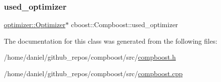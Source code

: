 \subsubsection{\texorpdfstring{used\+\_\+optimizer}{used\_optimizer}}
{\footnotesize\ttfamily \hyperlink{classoptimizer_1_1_optimizer}{optimizer\+::\+Optimizer}$\ast$ cboost\+::\+Compboost\+::used\+\_\+optimizer\hspace{0.3cm}{\ttfamily [private]}}



The documentation for this class was generated from the following files\+:\begin{DoxyCompactItemize}
\item 
/home/daniel/github\+\_\+repos/compboost/src/\hyperlink{compboost_8h}{compboost.\+h}\item 
/home/daniel/github\+\_\+repos/compboost/src/\hyperlink{compboost_8cpp}{compboost.\+cpp}\end{DoxyCompactItemize}

